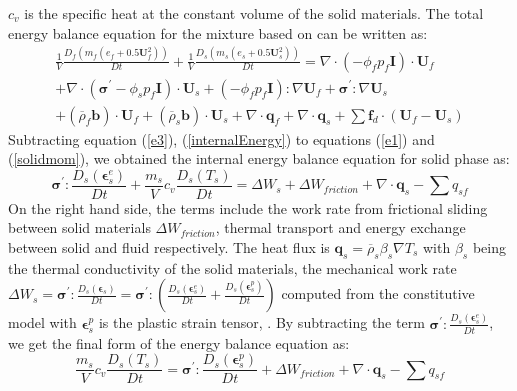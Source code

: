 \documentclass[preprint,12pt]{elsarticle}
\begin{document}
%
%
$c_v$ is the specific heat at the constant volume of the solid materials. The total energy balance equation for the mixture based on \cite{Hassanizadeh} can be written as:\\
%
%
\begin{equation}
\label{e3}
\begin{gathered}
     \frac{1}{V}\frac{D_f(m_f (e_f+0.5\pmb{U}_f^2))}{Dt} + \frac{1}{V}\frac{D_s(m_s (e_s+0.5\pmb{U}_s^2))}{Dt} = \nabla \cdot (-\phi_f p_f\pmb{I}) \cdot \pmb{U}_f \\
     + \nabla \cdot (\pmb{\sigma}^\prime-\phi_s p_f\pmb{I}) \cdot \pmb{U}_s + (-\phi_f p_f\pmb{I}) : \nabla \pmb{U}_f + \pmb{\sigma}^\prime : \nabla \pmb{U}_s \\
     + (\overline{\rho}_f \pmb{b}) \cdot \pmb{U}_f + (\overline{\rho}_s \pmb{b}) \cdot \pmb{U}_s
     + \nabla \cdot \pmb{q}_f + \nabla \cdot \pmb{q}_s +  \sum \pmb{f}_{d} \cdot (\pmb{U}_f - \pmb{U}_s)  
\end {gathered}
\end {equation}
%
%
Subtracting equation (\ref{e3}), (\ref{internalEnergy}) to equations (\ref{e1}) and (\ref{solidmom}), we obtained the internal energy balance equation for solid phase as:
%
%
\begin{equation}
      \pmb{\sigma}^\prime :\frac{D_s( \pmb{\epsilon}_s^e)}{Dt}  + \frac{m_s}{V} c_v \frac{D_s( T_s)}{Dt} = \Delta W_{s} +  \Delta W_{friction} + \nabla \cdot \pmb{q}_s -  \sum q_{sf} 
\end {equation}
%
%
On the right hand side, the terms include the work rate from frictional sliding between solid materials  $\Delta W_{friction}$, thermal transport and energy exchange between solid and fluid respectively. The heat flux is $\pmb{q}_s = \overline{\rho}_s \beta_s \nabla T_s$ with $\beta_s$ being the thermal conductivity of the solid materials, the mechanical work rate $\Delta W_{s} = \pmb{\sigma}^\prime :\frac{D_s( \pmb{\epsilon}_s)}{Dt}  = \pmb{\sigma}^\prime : (\frac{D_s( \pmb{\epsilon}_s^e)}{Dt}  + \frac{D_s( \pmb{\epsilon}_s^p)}{Dt}) $ computed from the constitutive model with $\pmb{\epsilon}_s^p$ is the plastic strain tensor, . By subtracting the term $\pmb{\sigma}^\prime : \frac{D_s( \pmb{\epsilon}_s^e)}{Dt}$, we get the final form of the energy balance equation as:
%
%
\begin{equation}
      \frac{m_s}{V} c_v \frac{D_s( T_s)}{Dt} = \pmb{\sigma}^\prime : \frac{D_s( \pmb{\epsilon}_s^p)}{Dt} +  \Delta W_{friction} + \nabla \cdot \pmb{q}_s -  \sum q_{sf} 
\end {equation}
%
%
\end{document}
